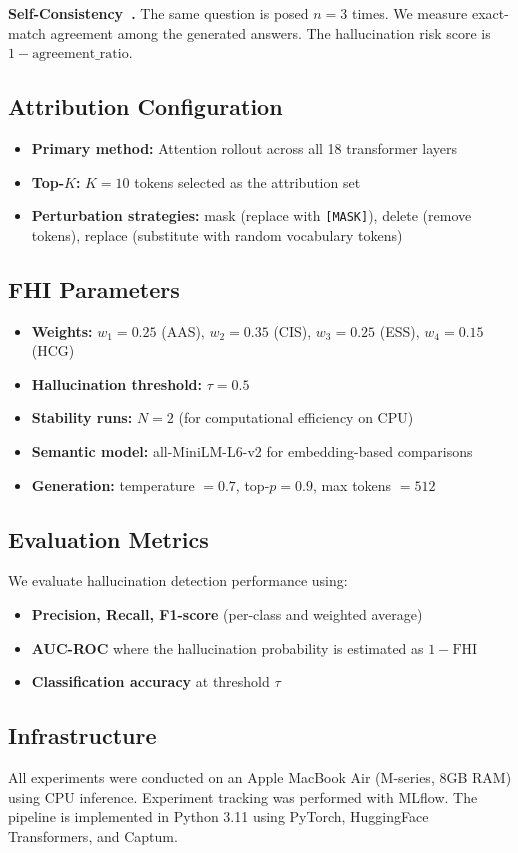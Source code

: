 \textbf{Self-Consistency~\cite{wang2022self}.} The same question is posed $n=3$ times. We measure exact-match agreement among the generated answers. The hallucination risk score is $1 - \text{agreement\_ratio}$.

\subsection{Attribution Configuration}

\begin{itemize}
    \item \textbf{Primary method:} Attention rollout across all 18 transformer layers
    \item \textbf{Top-$K$:} $K = 10$ tokens selected as the attribution set
    \item \textbf{Perturbation strategies:} mask (replace with \texttt{[MASK]}), delete (remove tokens), replace (substitute with random vocabulary tokens)
\end{itemize}

\subsection{FHI Parameters}

\begin{itemize}
    \item \textbf{Weights:} $w_1 = 0.25$ (AAS), $w_2 = 0.35$ (CIS), $w_3 = 0.25$ (ESS), $w_4 = 0.15$ (HCG)
    \item \textbf{Hallucination threshold:} $\tau = 0.5$
    \item \textbf{Stability runs:} $N = 2$ (for computational efficiency on CPU)
    \item \textbf{Semantic model:} all-MiniLM-L6-v2 for embedding-based comparisons
    \item \textbf{Generation:} temperature $= 0.7$, top-$p = 0.9$, max tokens $= 512$
\end{itemize}

\subsection{Evaluation Metrics}

We evaluate hallucination detection performance using:
\begin{itemize}
    \item \textbf{Precision, Recall, F1-score} (per-class and weighted average)
    \item \textbf{AUC-ROC} where the hallucination probability is estimated as $1 - \text{FHI}$
    \item \textbf{Classification accuracy} at threshold $\tau$
\end{itemize}

\subsection{Infrastructure}

All experiments were conducted on an Apple MacBook Air (M-series, 8GB RAM) using CPU inference. Experiment tracking was performed with MLflow. The pipeline is implemented in Python 3.11 using PyTorch, HuggingFace Transformers, and Captum.
